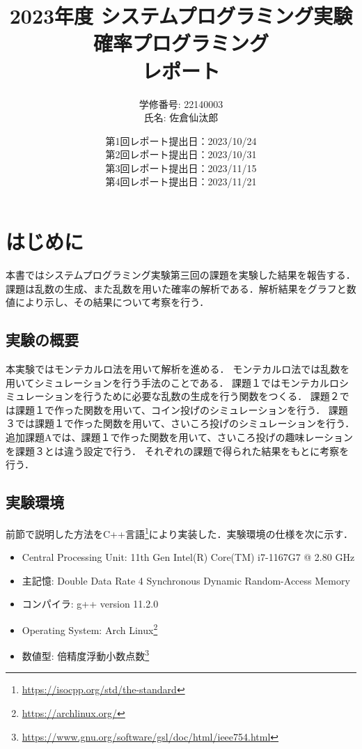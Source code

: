 \documentclass[fleqn, a4paper. 12pt]{ltjsarticle} %
\title{
2023年度 システムプログラミング実験\\
確率プログラミング\\
レポート}
\author{
学修番号: 22140003 \\
氏名: 佐倉仙汰郎 \\
}
\begin{document}
\date{
第1回レポート提出日：2023/10/24 \\
第2回レポート提出日：2023/10/31 \\
第3回レポート提出日：2023/11/15 \\
第4回レポート提出日：2023/11/21 \\
}
\maketitle

\section*{はじめに}
本書ではシステムプログラミング実験第三回の課題を実験した結果を報告する．課題は乱数の生成、また乱数を用いた確率の解析である．解析結果をグラフと数値により示し、その結果について考察を行う．
\subsection*{実験の概要}

本実験ではモンテカルロ法を用いて解析を進める．
モンテカルロ法では乱数を用いてシミュレーションを行う手法のことである．
課題１ではモンテカルロシミュレーションを行うために必要な乱数の生成を行う関数をつくる．
課題２では課題１で作った関数を用いて、コイン投げのシミュレーションを行う．
課題３では課題１で作った関数を用いて、さいころ投げのシミュレーションを行う．
追加課題Aでは、課題１で作った関数を用いて、さいころ投げの趣味レーションを課題３とは違う設定で行う．
それぞれの課題で得られた結果をもとに考察を行う．

\subsection*{実験環境}
前節で説明した方法をC++言語\footnote{\url{https://isocpp.org/std/the-standard}}により実装した．実験環境の仕様を次に示す．
\begin{itemize}
    \item Central Processing Unit: 11th Gen Intel(R) Core(TM) i7-1167G7 @ 2.80 GHz
    \item 主記憶: Double Data Rate 4 Synchronous Dynamic Random-Access Memory
    \item コンパイラ: g++ version 11.2.0
    \item Operating System: Arch Linux\footnote{\url{https://archlinux.org/}}
    \item 数値型: 倍精度浮動小数点数\footnote{\url{https://www.gnu.org/software/gsl/doc/html/ieee754.html}}
  \end{itemize}
\newpage
\end{document}
